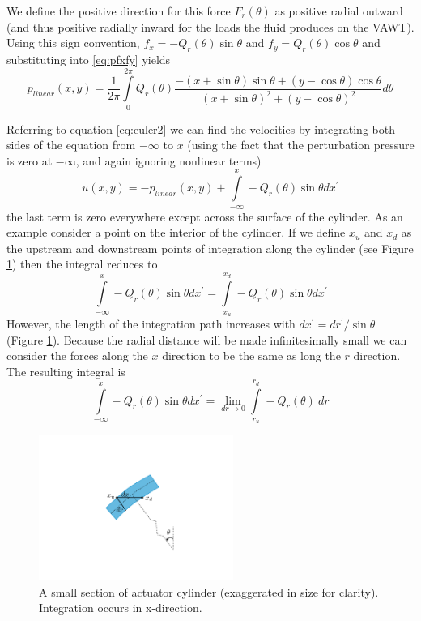 \documentclass{article}
\begin{document}

We define the positive direction for this force $F_r(\theta)$ as positive radial outward (and thus positive radially inward for the loads the fluid produces on the VAWT).  Using this sign convention, $f_x = -Q_r(\theta)\sin\theta$ and $f_y = Q_r(\theta)\cos\theta$ and substituting into \eqref{eq:pfxfy} yields
\begin{equation}
p_{linear}(x, y) = \frac{1}{2\pi}\int\limits_0^{2\pi} Q_r(\theta) \frac{-(x+\sin\theta)\sin\theta + (y-\cos\theta)\cos\theta}{(x+\sin\theta)^2 + (y-\cos\theta)^2} d\theta
\end{equation}

Referring to equation \eqref{eq:euler2} we can find the velocities by integrating both sides of the equation from $-\infty$ to $x$ (using the fact that the perturbation pressure is zero at $-\infty$, and again ignoring nonlinear terms)
\begin{equation}
u(x, y) = -p_{linear}(x, y) + \int\limits_{-\infty}^x -Q_r(\theta) \sin\theta dx^\prime
\end{equation}
the last term is zero everywhere except across the surface of the cylinder.  As an example consider a point on the interior of the cylinder.  If we define $x_u$ and $x_d$ as the upstream and downstream points of integration along the cylinder (see Figure \ref{fig:slice}) then the integral reduces to
\begin{equation}
\int\limits_{-\infty}^x -Q_r(\theta) \sin\theta dx^\prime=  \int\limits_{x_u}^{x_d} -Q_r(\theta) \sin\theta dx^\prime
\end{equation}
However, the length of the integration path increases with $dx^\prime = dr^\prime/\sin\theta$ (Figure \ref{fig:slice}).  Because the radial distance will be made infinitesimally small we can consider the forces along the $x$ direction to be the same as long the $r$ direction.  The resulting integral is
\begin{equation}
\int\limits_{-\infty}^x -Q_r(\theta) \sin\theta dx^\prime=   \lim_{dr \rightarrow 0} \int\limits_{r_u}^{r_d} -Q_r(\theta) \ dr
\end{equation}

\begin{figure}[htbp]
\begin{center}
\includegraphics[width=2.5in]{images/slice}
\caption{A small section of actuator cylinder (exaggerated in size for clarity).  Integration occurs in x-direction.}
\label{fig:slice}
\end{center}
\end{figure}
\end{document}
